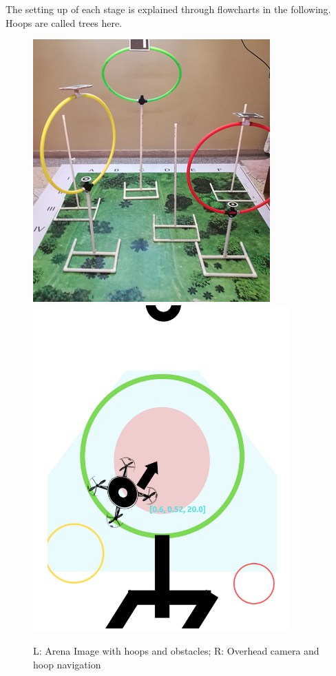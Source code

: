 The setting up of each stage is explained through flowcharts in the following. Hoops are called trees here.
\begin{figure}[H]
    \includegraphics[scale=0.9]{SummerInterReport/project/Images-Major/arena.png}
    \includegraphics[scale=0.9]{SummerInterReport/project/Images-Major/eyflow.png}
    
    \caption{L: Arena Image with hoops and obstacles; R: Overhead camera and hoop navigation}
    \label{fig:arena}
\end{figure}
